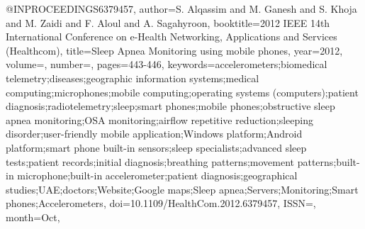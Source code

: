 @INPROCEEDINGS{6379457, 
author={S. {Alqassim} and M. {Ganesh} and S. {Khoja} and M. {Zaidi} and F. {Aloul} and A. {Sagahyroon}}, 
booktitle={2012 IEEE 14th International Conference on e-Health Networking, Applications and Services (Healthcom)}, 
title={Sleep Apnea Monitoring using mobile phones}, 
year={2012}, 
volume={}, 
number={}, 
pages={443-446}, 
keywords={accelerometers;biomedical telemetry;diseases;geographic information systems;medical computing;microphones;mobile computing;operating systems (computers);patient diagnosis;radiotelemetry;sleep;smart phones;mobile phones;obstructive sleep apnea monitoring;OSA monitoring;airflow repetitive reduction;sleeping disorder;user-friendly mobile application;Windows platform;Android platform;smart phone built-in sensors;sleep specialists;advanced sleep tests;patient records;initial diagnosis;breathing patterns;movement patterns;built-in microphone;built-in accelerometer;patient diagnosis;geographical studies;UAE;doctors;Website;Google maps;Sleep apnea;Servers;Monitoring;Smart phones;Accelerometers}, 
doi={10.1109/HealthCom.2012.6379457}, 
ISSN={}, 
month={Oct},}